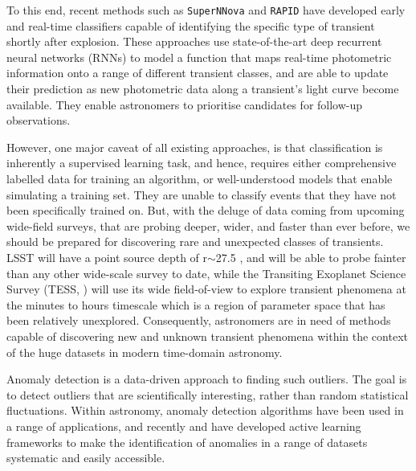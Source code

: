 \documentclass[fleqn,usenatbib]{mnras}
\begin{document}
To this end, recent methods such as \texttt{SuperNNova} \citep{SupernnoovaMoller2019}  and \texttt{RAPID} \citep{Muthukrishna19RAPID} have developed early and real-time classifiers capable of identifying the specific type of transient shortly after explosion. These approaches use state-of-the-art deep recurrent neural networks (RNNs) to model a function that maps real-time photometric information onto a range of different transient classes, and are able to update their prediction as new photometric data along a transient's light curve become available. They enable astronomers to prioritise candidates for follow-up observations.


However, one major caveat of all existing approaches, is that classification is inherently a supervised learning task, and hence, requires either comprehensive labelled data for training an algorithm, or well-understood models that enable simulating a training set. They are unable to classify events that they have not been specifically trained on. But, with the deluge of data coming from upcoming wide-field surveys, that are probing deeper, wider, and faster than ever before, we should be prepared for discovering rare and unexpected classes of transients. LSST will have a point source depth of r$\sim$27.5 \citep{LSST_Book_2009}, and will be able to probe fainter than any other wide-scale survey to date, while the Transiting Exoplanet Science Survey (TESS, \citealt{TESS_Ricker_2015}) will use its wide field-of-view to explore transient phenomena at the minutes to hours timescale which is a region of parameter space that has been relatively unexplored. Consequently, astronomers are in need of methods capable of discovering new and unknown transient phenomena within the context of the huge datasets in modern time-domain astronomy. 


Anomaly detection is a data-driven approach to finding such outliers. The goal is to detect outliers that are scientifically interesting, rather than random statistical fluctuations. Within astronomy, anomaly detection algorithms have been used in a range of applications, and recently \citet{Lochner2020Astronomaly} and \citet{Ishida2021_Timeseries} have developed active learning frameworks to make the identification of anomalies in a range of datasets systematic and easily accessible.
\end{document}
